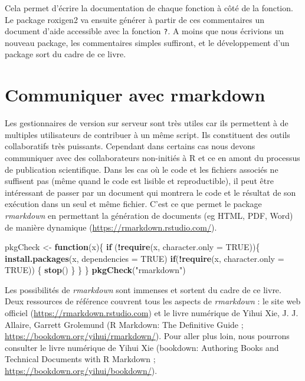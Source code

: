 \documentclass[
]{book}
\newenvironment{Shaded}{\begin{snugshade}}{\end{snugshade}}
\newcommand{\ControlFlowTok}[1]{\textcolor[rgb]{0.13,0.29,0.53}{\textbf{#1}}}
\newcommand{\DataTypeTok}[1]{\textcolor[rgb]{0.13,0.29,0.53}{#1}}
\newcommand{\KeywordTok}[1]{\textcolor[rgb]{0.13,0.29,0.53}{\textbf{#1}}}
\newcommand{\NormalTok}[1]{#1}
\newcommand{\OperatorTok}[1]{\textcolor[rgb]{0.81,0.36,0.00}{\textbf{#1}}}
\newcommand{\OtherTok}[1]{\textcolor[rgb]{0.56,0.35,0.01}{#1}}
\newcommand{\StringTok}[1]{\textcolor[rgb]{0.31,0.60,0.02}{#1}}
\begin{document}
Cela permet d'écrire la documentation de chaque fonction à côté de la fonction. Le package roxigen2 va ensuite générer à partir de ces commentaires un document d'aide accessible avec la fonction \texttt{\textquotesingle{}?\textquotesingle{}}. A moins que nous écrivions un nouveau package, les commentaires simples suffiront, et le développement d'un package sort du cadre de ce livre.

\hypertarget{communiquer-avec-rmarkdown}{%
\section{Communiquer avec rmarkdown}\label{communiquer-avec-rmarkdown}}

Les gestionnaires de version sur serveur sont très utiles car ils permettent à de multiples utilisateurs de contribuer à un même script. Ils constituent des outils collaboratifs très puissants. Cependant dans certains cas nous devons communiquer avec des collaborateurs non-initiés à R et ce en amont du processus de publication scientifique. Dans les cas où le code et les fichiers associés ne suffisent pas (même quand le code est lisible et reproductible), il peut être intéressant de passer par un document qui montrera le code et le résultat de son exécution dans un seul et même fichier. C'est ce que permet le package \emph{rmarkdown} en permettant la génération de documents (eg HTML, PDF, Word) de manière dynamique (\url{https://rmarkdown.rstudio.com/}).

\begin{Shaded}
\begin{Highlighting}[]
\NormalTok{pkgCheck <-}\StringTok{ }\ControlFlowTok{function}\NormalTok{(x)\{ }
    \ControlFlowTok{if}\NormalTok{ (}\OperatorTok{!}\KeywordTok{require}\NormalTok{(x, }\DataTypeTok{character.only =} \OtherTok{TRUE}\NormalTok{))\{}
        \KeywordTok{install.packages}\NormalTok{(x, }\DataTypeTok{dependencies =} \OtherTok{TRUE}\NormalTok{)}
        \ControlFlowTok{if}\NormalTok{(}\OperatorTok{!}\KeywordTok{require}\NormalTok{(x, }\DataTypeTok{character.only =} \OtherTok{TRUE}\NormalTok{)) \{}
            \KeywordTok{stop}\NormalTok{()}
\NormalTok{        \}}
\NormalTok{    \}}
\NormalTok{\}}
\KeywordTok{pkgCheck}\NormalTok{(}\StringTok{"rmarkdown"}\NormalTok{)}
\end{Highlighting}
\end{Shaded}

Les possibilités de \emph{rmarkdown} sont immenses et sortent du cadre de ce livre. Deux ressources de référence couvrent tous les aspects de \emph{rmarkdown} : le site web officiel (\url{https://rmarkdown.rstudio.com}) et le livre numérique de Yihui Xie, J. J. Allaire, Garrett Grolemund (R Markdown: The Definitive Guide ; \url{https://bookdown.org/yihui/rmarkdown/}). Pour aller plus loin, nous pourrons consulter le livre numérique de Yihui Xie (bookdown: Authoring Books and Technical Documents with R Markdown ; \url{https://bookdown.org/yihui/bookdown/}).
\end{document}
